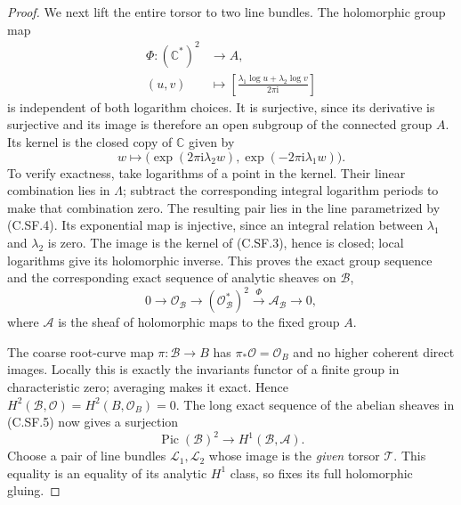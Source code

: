 \begin{proof}
We next lift the entire torsor to two
line bundles. The holomorphic group map
\[
 \begin{split}
 \Phi:(\mathbb C^*)^2&\longrightarrow A,\\
 (u,v)&\longmapsto
 \left[\frac{\lambda_1\log u+\lambda_2\log v}{2\pi\mathrm i}
                                                    \right]
 \end{split}
                                                               \tag{C.SF.3}
\]
is independent of both logarithm choices.
It is surjective, since its derivative
is surjective and its image is therefore
an open subgroup of the connected group
$A$. Its kernel is the closed copy of
$\mathbb C$ given by
\[
 w\longmapsto
 \bigl(\exp(2\pi\mathrm i\lambda_2w),
                  \exp(-2\pi\mathrm i\lambda_1w)\bigr).
                                                               \tag{C.SF.4}
\]
To verify exactness, take logarithms of
a point in the kernel. Their linear
combination lies in $\Lambda$; subtract
the corresponding integral logarithm
periods to make that combination zero.
The resulting pair lies in the line
parametrized by (C.SF.4). Its exponential
map is injective, since an integral
relation between $\lambda_1$ and
$\lambda_2$ is zero. The image is the
kernel of (C.SF.3), hence is closed;
local logarithms give its holomorphic
inverse. This proves the exact group
sequence and the corresponding exact
sequence of analytic sheaves on
$\mathcal B$,
\[
 0\longrightarrow\mathcal O_{\mathcal B}
   \longrightarrow(\mathcal O_{\mathcal B}^*)^2
   \xrightarrow{\Phi}\mathcal A_{\mathcal B}
   \longrightarrow0,
                                                               \tag{C.SF.5}
\]
where $\mathcal A$ is the sheaf of
holomorphic maps to the fixed group $A$.

The coarse root-curve map
$\pi:\mathcal B\to B$ has
$\pi_*\mathcal O=\mathcal O_B$ and
no higher coherent direct images.
Locally this is exactly the invariants
functor of a finite group in characteristic
zero; averaging makes it exact. Hence
$H^2(\mathcal B,\mathcal O)=H^2(B,\mathcal O_B)=0$.
The long exact sequence of the abelian
sheaves in (C.SF.5) now gives a surjection
\[
 \operatorname{Pic}(\mathcal B)^2
                 \longrightarrow H^1(\mathcal B,\mathcal A).
                                                               \tag{C.SF.6}
\]
Choose a pair of line bundles
$\mathcal L_1,\mathcal L_2$ whose
image is the \emph{given} torsor
$\mathcal T$. This equality is an
equality of its analytic $H^1$ class,
so fixes its full holomorphic gluing.


\end{proof}
